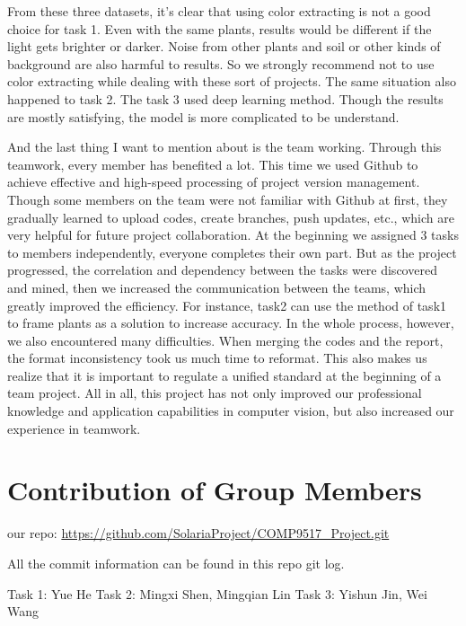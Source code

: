 \documentclass[conference]{IEEEtran}
\begin{document}
From these three datasets, it’s clear that using color extracting is not a good choice for task 1. Even with the same plants, results would be different if the light gets brighter or darker. Noise from other plants and soil or other kinds of background are also harmful to results. So we strongly recommend not to use color extracting while dealing with these sort of projects. The same situation also happened to task 2. The task 3 used deep learning method. Though the results are mostly satisfying, the model is more complicated to be understand. 

And the last thing I want to mention about is the team working. Through this teamwork, every member has benefited a lot. This time we used Github to achieve effective and high-speed processing of project version management. Though some members on the team were not familiar with Github at first, they gradually learned to upload codes, create branches, push updates, etc., which are very helpful for future project collaboration. At the beginning we assigned 3 tasks to members independently, everyone completes their own part. But as the project progressed, the correlation and dependency between the tasks were discovered and mined, then we increased the communication between the teams, which greatly improved the efficiency. For instance, task2 can use the method of task1 to frame plants as a solution to increase accuracy. In the whole process, however, we also encountered many difficulties. When merging the codes and the report, the format inconsistency took us much time to reformat. This also makes us realize that it is important to regulate a unified standard at the beginning of a team project. All in all, this project has not only improved our professional knowledge and application capabilities in computer vision, but also increased our experience in teamwork. 

\section{Contribution of Group Members}

our repo: \url{https://github.com/SolariaProject/COMP9517_Project.git}

All the commit information can be found in this repo git log.

Task 1: Yue He
Task 2: Mingxi Shen, Mingqian Lin
Task 3: Yishun Jin, Wei Wang




\end{document}
